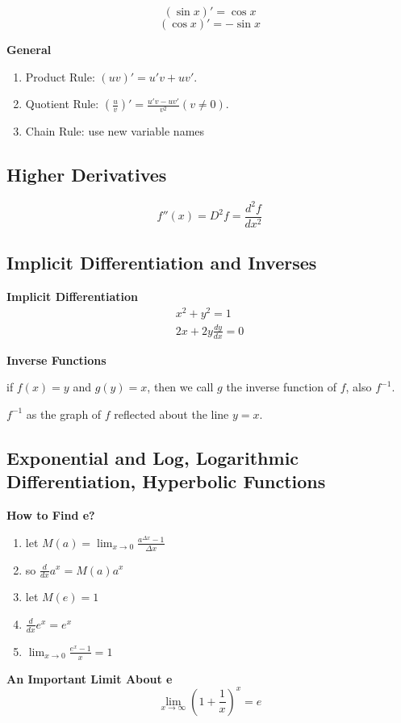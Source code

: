 \documentclass{article}
\newcommand\limitx[1]{\lim_{x \to #1}}
\begin{document}
$$(\sin x)' = \cos x$$
$$(\cos x)' = -\sin x$$

\textbf{General}

\begin{enumerate}
\item Product Rule: $(uv)' = u'v + uv'$.
\item Quotient Rule: $(\frac{u}{v})' = \frac{u'v-uv'}{v^2}(v \not= 0)$.
\item Chain Rule: use new variable names
\end{enumerate}

\subsection{Higher Derivatives}
$$f''(x) = D^2f = \frac{d^2f}{dx^2}$$

\subsection{Implicit Differentiation and Inverses}

\textbf{Implicit Differentiation}
\begin{gather*}
x^2 + y^2 = 1 \\
2x + 2y\frac{dy}{dx} = 0
\end{gather*}

\textbf{Inverse Functions}

if $f(x) = y$ and $g(y) = x$, then we call $g$ the inverse function of $f$, also $f^{-1}$.

$f^{-1}$ as the graph of $f$ reflected about the line $y = x$.

\subsection{Exponential and Log, Logarithmic Differentiation, Hyperbolic Functions}
\textbf{How to Find e?}
\begin{enumerate}
  \item let $M(a) = \limitx{0}\frac{a^{\Delta x} - 1}{\Delta x}$
  \item so $\frac{d}{dx}a^x = M(a)a^x$
  \item let $M(e) = 1$
  \item $\frac{d}{dx}e^x = e^x$
  \item $\limitx{0}\frac{e^x - 1}{x} = 1$
\end{enumerate}

\textbf{An Important Limit About e}
$$\limitx{\infty}(1 + \frac{1}{x})^x = e$$
\end{document}
